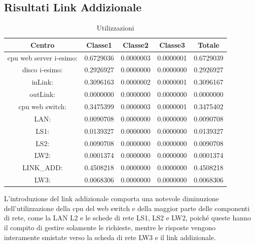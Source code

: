 \subsection{Risultati Link Addizionale}
\begin{table}[htbp]
\begin{center}
\begin{tabular}{||c|c|c|c|c||}
\hline
Centro &Classe1 &Classe2 &Classe3 &Totale\\
\hline
\hline
 cpu web server i-esimo: 	&0.6729036	&0.0000003	&0.0000001	&0.6729039\\
\hline
 disco i-esimo: 	&0.2926927	&0.0000000	&0.0000000	&0.2926927\\
\hline
 inLink: 	&0.3096163	&0.0000002	&0.0000001	&0.3096167\\
\hline
 outLink: 	&0.0000000	&0.0000000	&0.0000000	&0.0000000\\
\hline
 cpu web switch: 	&0.3475399	&0.0000003	&0.0000001	&0.3475402\\
\hline
 LAN: 	&0.0090708	&0.0000000	&0.0000000	&0.0090708\\
\hline
 LS1: 	&0.0139327	&0.0000000	&0.0000000	&0.0139327\\
\hline
 LS2:	&0.0090708	&0.0000000	&0.0000000	&0.0090708\\
\hline
 LW2: 	&0.0001374	&0.0000000	&0.0000000	&0.0001374\\
\hline
 LINK\_ADD: 	&0.4508218	&0.0000000	&0.0000000	&0.4508218\\
\hline
 LW3: 	&0.0068306	&0.0000000	&0.0000000	&0.0068306\\
\hline
\end{tabular}
\end{center}
\caption{Utilizzazioni}
\label{utilizzazioni}
\end{table}
L'introduzione del link addizionale comporta una notevole diminuzione dell'utilizzazione della cpu del web switch e  della maggior parte delle componenti di rete, come la LAN L2 e le schede di rete LS1, LS2 e LW2, poiché queste hanno il compito di gestire solamente le richieste, mentre le risposte  vengono interamente smistate verso la scheda di rete LW3 e il link addizionale.
